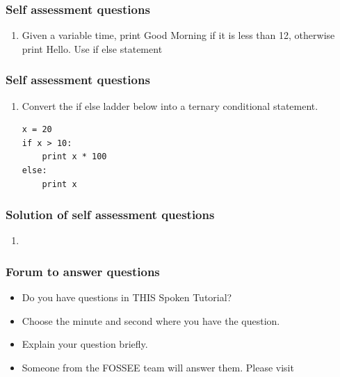 \documentclass[17pt]{beamer}
\newcounter{saveenumi}
\newcommand{\seti}{\setcounter{saveenumi}{\value{enumi}}}
\newcommand{\conti}{\setcounter{enumi}{\value{saveenumi}}}
\begin{document}
\begin{frame}[fragile]
\frametitle{Self assessment questions}
\label{sec-11.1}

\begin{enumerate}
\item Given a variable time, print Good Morning if it is less than 12, otherwise print Hello.  Use if else statement
\seti
\end{enumerate}
\end{frame}
\begin{frame}[fragile]
\frametitle{Self assessment questions}
\label{sec-11.2}

\begin{enumerate}
\conti
\item Convert the if else ladder below into a ternary conditional
   statement.
\lstset{language=Python}
\begin{lstlisting}
x = 20
if x > 10:
    print x * 100
else:
    print x
\end{lstlisting}
\end{enumerate}
\end{frame}
\begin{frame}[fragile]
\frametitle{Solution of self assessment questions}
\label{sec-12}


\begin{enumerate}
\item \lstset{language=Python}
\end{enumerate}
\end{frame}
\begin{frame}
\frametitle{Forum to answer questions}
\begin{itemize}
\item Do you have questions in THIS Spoken Tutorial?
\item Choose the minute and second where you have the question.
\item Explain your question briefly.
\item Someone from the FOSSEE team will answer them. Please visit 
\end{itemize}
\begin{center}
{\color{blue}{http://forums.spoken-tutorial.org/}}
 \end{center} 
\end{frame}
\end{document}
